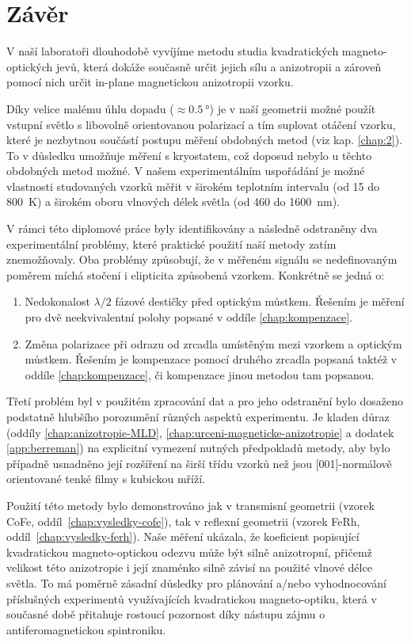 \chapter*{Závěr}

V naší laboratoři dlouhodobě vyvíjíme metodu studia kvadratických mag\-ne\-to-optických jevů, která dokáže současně určit jejich sílu a anizotropii a zároveň pomocí nich určit in-plane magnetickou anizotropii vzorku.

Díky velice malému úhlu dopadu ($\approx\SI{0.5}{\degree}$) je v naší geometrii možné použít vstupní světlo s libovolně orientovanou polarizací a tím suplovat otáčení vzorku, které je nezbytnou součástí postupu měření obdobných metod (viz kap. \ref{chap:2}).
To v důsledku umožňuje měření s kryostatem, což doposud nebylo u těchto obdobných metod možné.
V našem experimentálním uspořádání je možné vlastnosti studovaných vzorků měřit v širokém teplotním intervalu (od 15 do \SI{800}{\kelvin}) a širokém oboru vlnových délek světla (od 460 do \SI{1600}{\nano\meter}).

V rámci této diplomové práce byly identifikovány a následně odstraněny dva experimentální problémy, které praktické použití naší metody zatím znemožňovaly.
Oba problémy způsobují, že v měřeném signálu se nedefinovaným poměrem míchá stočení i elipticita způsobená vzorkem.
Konkrétně se jedná o:
\begin{enumerate}
    \item Nedokonalost $\lambda/2$ fázové destičky před optickým můstkem. 
        Řešením je měření pro dvě neekvivalentní polohy popsané v oddíle \ref{chap:kompenzace}.
    \item Změna polarizace při odrazu od zrcadla umístěným mezi vzorkem a optickým můstkem.
        Řešením je kompenzace pomocí druhého zrcadla popsaná taktéž v oddíle \ref{chap:kompenzace}, či kompenzace jinou metodou tam popsanou.
\end{enumerate}

Třetí problém byl v použitém zpracování dat a pro jeho odstranění bylo dosaženo podstatně hlubšího porozumění různých aspektů experimentu.
Je kladen důraz (oddíly \ref{chap:anizotropie-MLD}, \ref{chap:urceni-magneticke-anizotropie} a dodatek \ref{app:berreman}) na explicitní vymezení nutných předpokladů metody, aby bylo případně usnadněno její rozšíření na širší třídu vzorků než jsou [001]-normálově orientované tenké filmy s kubickou mříží.

Použití této metody bylo demonstrováno jak v transmisní geometrii (vzorek CoFe, oddíl~\ref{chap:vysledky-cofe}), tak v reflexní geometrii (vzorek FeRh, oddíl~\ref{chap:vysledky-ferh}).
Naše měření ukázala, že koeficient popisující kvadratickou magneto-optickou odezvu může být silně anizotropní, přičemž velikost této anizotropie i její znaménko silně závisí na použité vlnové délce světla.
To má poměrně zásadní důsledky pro plánování a/nebo vyhodnocování příslušných experimentů využívajících kvadratickou magneto-optiku, která v současné době přitahuje rostoucí pozornost díky nástupu zájmu o antiferomagnetickou spintroniku.
